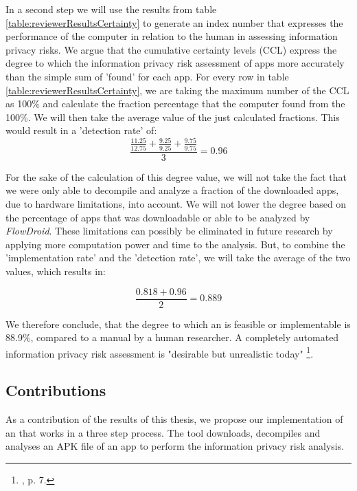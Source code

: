 In a second step we will use the results from table \ref{table:reviewerResultsCertainty} to generate an index number that expresses the performance of the computer in relation to the human in assessing information privacy risks.
We argue that the cumulative certainty levels (CCL) express the degree to which  the information privacy risk assessment of \mH apps more accurately than the simple sum of 'found' \ipp for each app.
For every row in table \ref{table:reviewerResultsCertainty}, we are taking the maximum number of the CCL as 100\% and calculate the fraction percentage that the computer found from the 100\%.
We will then take the average value of the just calculated fractions.
This would result in a 'detection rate' of:
\begin{equation}
	\frac{\frac{11.25}{12.75} + \frac{9.25}{9.25} + \frac{9.75}{9.75}}{3} = 0.96
\end{equation}

For the sake of the calculation of this degree value, we will not take the fact that we were only able to decompile and analyze a fraction of the downloaded apps, due to hardware limitations, into account.
We will not lower the degree based on the percentage of apps that was downloadable or able to be analyzed by \textit{FlowDroid}.
These limitations can possibly be eliminated in future research by applying more computation power and time to the analysis.
But, to combine the 'implementation rate' and the 'detection rate', we will take the average of the two values, which results in:

\begin{equation}
	\frac{0.818 + 0.96}{2} = 0.889
\end{equation}

We therefore conclude, that the degree to which an \aiprat is feasible or implementable is 88.9\%, compared to a manual \sca by a human researcher.
A completely automated information privacy risk assessment is "desirable but unrealistic today" \footnote{\cite{Knorr2015}, p. 7.}.

\subsection{Contributions}

As a contribution of the results of this thesis, we propose our implementation of an \aiprat that works in a three step process.
The tool downloads, decompiles and analyses an APK file of an app to perform the information privacy risk analysis.

